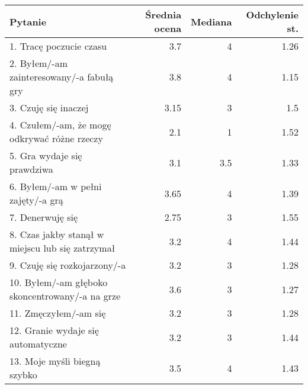 \begin{table}[h!]
    \begin{center}
        \begin{tabular}{|m{10em}|r|r|r|}
            \hline
            Pytanie                                                           & Średnia ocena & Mediana & Odchylenie st. \\
            \hline
            1. Tracę poczucie czasu                                           & 3.7           & 4       & 1.26           \\
            2. Byłem/-am \newline zainteresowany/-a fabułą gry                & 3.8           & 4       & 1.15           \\
            3. Czuję się inaczej                                              & 3.15          & 3       & 1.5            \\
            4. Czułem/-am, że mogę odkrywać różne rzeczy                      & 2.1           & 1       & 1.52           \\
            5. Gra wydaje się prawdziwa                                       & 3.1           & 3.5     & 1.33           \\
            6. Byłem/-am \newline w pełni zajęty/-a grą                       & 3.65          & 4       & 1.39           \\
            7. Denerwuję się                                                  & 2.75          & 3       & 1.55           \\
            8. Czas jakby stanął w miejscu lub się zatrzymał                  & 3.2           & 4       & 1.44           \\
            9. Czuję się \newline rozkojarzony/-a                             & 3.2           & 3       & 1.28           \\
            10. Byłem/-am głęboko \newline skoncentrowany/-a \newline na grze & 3.6           & 3       & 1.27           \\
            11. Zmęczyłem/-am się                                             & 3.2           & 3       & 1.28           \\
            12. Granie wydaje się automatyczne                                & 3.2           & 3       & 1.44           \\
            13. Moje myśli \newline biegną szybko                             & 3.5           & 4       & 1.43           \\

\end{tabular}
\end{center}
\end{table}
